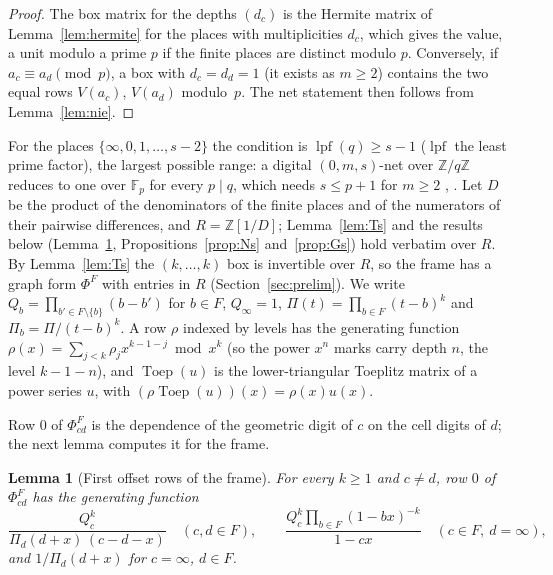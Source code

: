 \documentclass[11pt]{amsart}
\newtheorem{lemma}[theorem]{Lemma}
\theoremstyle{definition}
\theoremstyle{plain}
\newcommand{\Z}{\mathbb{Z}}
\newcommand{\F}{\mathbb{F}}
\begin{document}
\begin{proof}
The box matrix for the depths $(d_c)$ is the Hermite matrix of Lemma~\ref{lem:hermite} for the places with multiplicities $d_c$, which gives the value, a unit modulo a prime $p$ if the finite places are distinct modulo $p$. Conversely, if $a_c\equiv a_d\pmod p$, a box with $d_c=d_d=1$ (it exists as $m\ge2$) contains the two equal rows $V(a_c)$, $V(a_d)$ modulo~$p$. The net statement then follows from Lemma~\ref{lem:nie}.
\end{proof}

For the places $\{\infty,0,1,\dots,s-2\}$ the condition is $\operatorname{lpf}(q)\ge s-1$ ($\operatorname{lpf}$ the least prime factor), the largest possible range: a digital $(0,m,s)$-net over $\Z/q\Z$ reduces to one over $\F_p$ for every $p\mid q$, which needs $s\le p+1$ for $m\ge2$ \cite[Cor.~5.11]{Nie87}, \cite[Thm.~2, Cor.~2]{LNS96}. Let $D$ be the product of the denominators of the finite places and of the numerators of their pairwise differences, and $R=\Z[1/D]$; Lemma~\ref{lem:Ts} and the results below (Lemma~\ref{lem:Rs}, Propositions~\ref{prop:Ns} and~\ref{prop:Gs}) hold verbatim over $R$. By Lemma~\ref{lem:Ts} the $(k,\dots,k)$ box is invertible over $R$, so the frame has a graph form $\Phi^F$ with entries in $R$ (Section~\ref{sec:prelim}). We write $Q_b=\prod_{b'\in F\setminus\{b\}}(b-b')$ for $b\in F$, $Q_\infty=1$, $\Pi(t)=\prod_{b\in F}(t-b)^k$ and $\Pi_b=\Pi/(t-b)^k$. A row $\rho$ indexed by levels has the generating function $\rho(x)=\sum_{j<k}\rho_jx^{k-1-j}\bmod x^k$ (so the power $x^n$ marks carry depth $n$, the level $k-1-n$), and $\operatorname{Toep}(u)$ is the lower-triangular Toeplitz matrix of a power series $u$, with $(\rho\operatorname{Toep}(u))(x)=\rho(x)u(x)$.

Row $0$ of $\Phi^F_{cd}$ is the dependence of the geometric digit of $c$ on the cell digits of $d$; the next lemma computes it for the frame.

\begin{lemma}[First offset rows of the frame]\label{lem:Rs}
For every $k\ge1$ and $c\ne d$, row $0$ of $\Phi^F_{cd}$ has the generating function
\[
\frac{Q_c^k}{\Pi_d(d+x)\,(c-d-x)}\quad(c,d\in F),\qquad
\frac{Q_c^k\prod_{b\in F}(1-bx)^{-k}}{1-cx}\quad(c\in F,\ d=\infty),
\]
and $1/\Pi_d(d+x)$ for $c=\infty$, $d\in F$.
\end{lemma}
\end{document}
